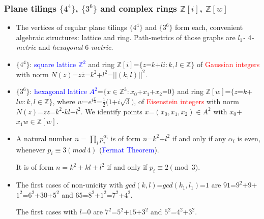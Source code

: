 \documentclass{beamer}
\begin{document}
\begin{frame}\frametitle{Plane tilings $\{4^4\}$, $\{3^6\}$ and 
 complex rings 
$\mathbb{Z}[i]$,
$\mathbb{Z}[w]$}
\vspace{-3mm}
\begin{itemize}
\item
The vertices of regular plane tilings $\{4^4\}$  and
$\{3^6\}$ form each,  convenient  algebraic structures: lattice and  ring.
Path-metrics of those graphs are {\em $l_1$- $4$-metric} and {\em 
hexagonal  
$6$-metric}.
\item $\{4^4\}$:
\textcolor{blue}{square lattice $\mathbb{Z}^2$} and  ring
$\mathbb{Z}[i]$=$\{z$=$k$+$li: k,l \in \mathbb{Z}\}$ of
\textcolor{red}{Gaussian integers} with norm
$N(z)$=$z\overline{z}$=$k^2$+$l^2$=$||(k,l)||^2$.
\item $\{3^6\}$:  \textcolor{blue}{hexagonal lattice $A^2$}=$\{x\in 
\mathbb{Z}^3:
x_0$+$x_1$+$x_2$=$0\}$  and  ring
$\mathbb{Z}[w]$=$\{z$=$k$+$lw: k,l \in \mathbb{Z}\}$, where
$w$=$e^{i\frac{\pi}{3}}$=$\frac{1}{2}(1$+$i\sqrt{3})$,  of
\textcolor{red}{Eisenstein integers}
with norm   
$N(z)$=$z\overline{z}$=$k^2$-$kl$+$l^2$.
We identify  points $x$=$(x_0,x_1,x_2)\in A^2$ with 
$x_0$+$x_1w\in \mathbb{Z}[w]$.
\pause

\item A natural number  $n= \prod_{i}p_i^{\alpha_i}$ is of form
$n$=$k^2$+$l^2$ if and only if any $\alpha_i$ is even,
whenever $p_i \equiv 3(mod\,4)$ (\textcolor{blue}{Fermat Theorem}).

It is of form 
$n=k^2+kl+l^2$ if and only if 
$p_i\equiv 2\pmod 3$.

\item The first cases of non-unicity with 
$gcd(k,l)$=$gcd(k_1,l_1)$=$1$ are $91$=$9^2$+$9$+$1^2$=$6^2$+$30$+$5^2$  
and $65$=$8^2$+$1^2$=$7^2$+$4^2$. 

The first cases with $l$=$0$ are 
 $7^2$=$5^2$+$15$+$3^2$ and $5^2$=$4^2$+$3^2$.
\end{itemize}
\end{frame}
\end{document}
